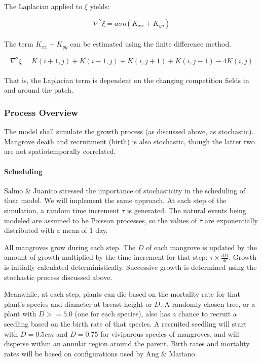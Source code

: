 The Laplacian applied to $\xi$ yields:

\begin{equation}
\nabla^2 \xi = a\sigma\eta (K_{xx} + K_{yy}) 
\end{equation}\\

The term $K_{xx} + K_{yy}$ can be estimated using the finite difference method.

\begin{equation}
\nabla^2 \xi = K(i+1, j) + K(i-1,j) + K(i, j+1) + K(i,j-1) - 4K(i,j)
\end{equation}\\ 

That is, the Laplacian term is dependent on the changing competition fields in and around the patch.

\subsubsection{Process Overview}
The model shall simulate the growth process (as discussed above, as stochastic). Mangrove death and recruitment (birth) is also stochastic, though the latter two are not spatiotemporally correlated.

\paragraph{Scheduling}
Salmo \& Juanico stressed the importance of stochasticity in the scheduling of their model. We will implement the same approach. At each step of the simulation, a random time increment $\tau$ is generated. The natural events being modeled are assumed to be Poisson processes, so the values of $\tau$ are exponentially distributed with a mean of 1 day.

All mangroves grow during each step. The $D$ of each mangrove is updated by the amount of growth multiplied by the time increment for that step: $\tau \times \frac{dD}{dt}$. Growth is initially calculated deterministically. Successive growth is determined using the stochastic process discussed above.

Meanwhile, at each step, plants can die based on the mortality rate for that plant's species and diameter at breast height or $D$. A randomly chosen tree, or a plant with $D >= 5.0$ (one for each species), also has a chance to recruit a seedling based on the birth rate of that species. A recruited seedling will start with $D = 0.5 cm$ and $D = 0.75$ for viviparous species of mangroves, and will disperse within an annular region around the parent. Birth rates and mortality rates will be based on configurations used by Ang \& Mariano.

